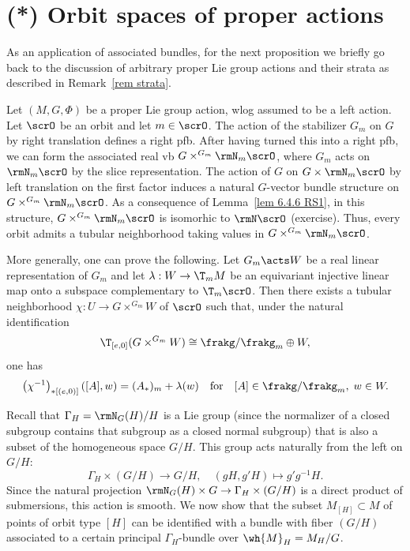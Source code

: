 \section{(*) Orbit spaces of proper actions}

As an application of associated bundles, for the next proposition we briefly go back to the discussion of arbitrary proper Lie group actions and their strata as described in Remark~\ref{rem strata}.

\begin{rem}[{{\cite[Rem.~6.5.8]{RS1}}}]\label{rem 6.5.8 RS1}
    Let $(M,G,\Phi)$ be a proper Lie group action, \gls{wlog} assumed to be a left action. Let $\scrO$ be an orbit and let $m\in\scrO$. The action of the stabilizer $G_m$ on $G$ by right translation defines a right \gls{pfb}. After having turned this into a right \gls{pfb}, we can form the associated real \gls{vb} $G\times^{G_m}\rmN_m\scrO$, where $G_m$ acts on $\rmN_m\scrO$ by the slice representation. The action of $G$ on $G\times\rmN_m\scrO$ by left translation on the first factor induces a natural $G$-vector bundle structure on $G\times^{G_m}\rmN_m\scrO$. As a consequence of Lemma~\ref{lem 6.4.6 RS1}, in this structure,  $G\times^{G_m}\rmN_m\scrO$ is isomorhic to $\rmN\scrO$ (exercise). Thus, every orbit admits a tubular neighborhood taking values in $G\times^{G_m}\rmN_m\scrO$.

    More generally, one can prove the following. Let $G_m\acts W$ be a real linear representation of $G_m$ and let $\lambda:W\to \T_m M$ be an equivariant injective linear map onto a subspace complementary to $\T_m\scrO$. Then there exists a tubular neighborhood $\chi:U\to G\times^{G_m}W$ of $\scrO$ such that, under the natural identification 
    \[\T_{[e,0]}(G\times^{G_m}W)\cong \frakg\slash\frakg_m\oplus W,\]
    one has 
    \[\left(\chi^{-1}\right)_{\ast[(e,0)]}\left([A],w\right)=(A_\ast)_m+\lambda(w)\quad\text{for}\quad  [A]\in\frakg\slash\frakg_m,\; w\in W.\]
\end{rem}

Recall that $\Gamma_H=\rmN_G(H)\slash H$ is a Lie group (since the normalizer of a closed subgroup contains that subgroup as a closed normal subgroup) that is also a subset of the homogeneous space $G\slash H$. This group acts naturally from the left on $G\slash H$:
\[\Gamma_H\times (G\slash H)\to G\slash H,\quad (gH,g'H)\mapsto g'g^{-1}H.\]
Since the natural projection $\rmN_G(H)\times G\to \Gamma_H\times (G\slash H)$ is a direct product of submersions, this action is smooth. We now show that the subset $M_{[H]}\subset M$ of points of orbit type $[H]$ can be identified with a bundle with fiber $(G\slash H)$ associated to a certain principal $\Gamma_H$-bundle over $\wh{M}_H=M_H\slash G$.

